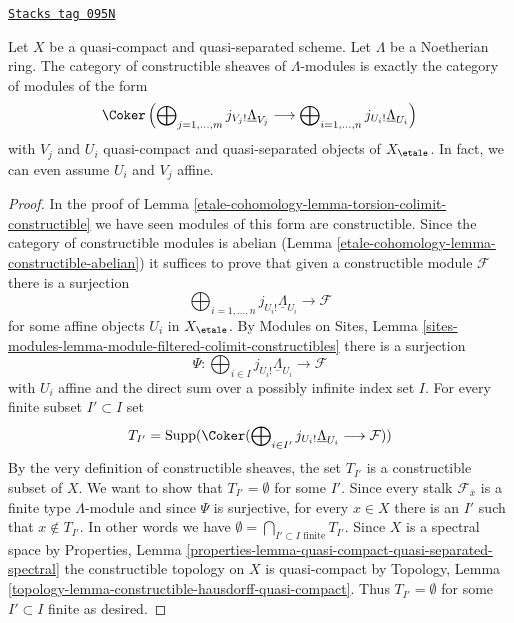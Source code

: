 \begin{lemma}
\label{etale-cohomology-lemma-category-constructible-modules}
\href{https://stacks.math.columbia.edu/tag/095N}{\texttt{Stacks tag 095N}}

Let $X$ be a quasi-compact and quasi-separated scheme. Let $\Lambda$
be a Noetherian ring. The category of constructible sheaves of
$\Lambda$-modules is exactly the category of modules of the form
$$
\Coker\left(
\bigoplus\nolimits_{j = 1, \ldots, m} j_{V_j!}\underline{\Lambda}_{V_j}
\longrightarrow
\bigoplus\nolimits_{i = 1, \ldots, n} j_{U_i!}\underline{\Lambda}_{U_i}
\right)
$$
with $V_j$ and $U_i$ quasi-compact and quasi-separated objects of
$X_\etale$. In fact, we can even assume $U_i$ and $V_j$ affine.
\end{lemma}

\begin{proof}
In the proof of Lemma \ref{etale-cohomology-lemma-torsion-colimit-constructible}
we have seen modules of this form are constructible. Since the
category of constructible modules is abelian
(Lemma \ref{etale-cohomology-lemma-constructible-abelian})
it suffices to prove that given a constructible module $\mathcal{F}$
there is a surjection
$$
\bigoplus\nolimits_{i = 1, \ldots, n} j_{U_i!}\underline{\Lambda}_{U_i}
\longrightarrow \mathcal{F}
$$
for some affine objects $U_i$ in $X_\etale$. By
Modules on Sites, Lemma
\ref{sites-modules-lemma-module-filtered-colimit-constructibles}
there is a surjection
$$
\Psi :
\bigoplus\nolimits_{i \in I} j_{U_i!}\underline{\Lambda}_{U_i}
\longrightarrow
\mathcal{F}
$$
with $U_i$ affine and the direct sum over a possibly infinite
index set $I$. For every finite subset $I' \subset I$ set
$$
T_{I'} = \text{Supp}(\Coker(
\bigoplus\nolimits_{i \in I'} j_{U_i!}\underline{\Lambda}_{U_i}
\longrightarrow \mathcal{F}))
$$
By the very definition of constructible sheaves, the set $T_{I'}$
is a constructible subset of $X$. We want to show that $T_{I'} = \emptyset$
for some $I'$. Since every stalk $\mathcal{F}_{\overline{x}}$ is
a finite type $\Lambda$-module and since $\Psi$ is surjective, for
every $x \in X$ there is an $I'$ such that $x \not \in T_{I'}$.
In other words we have
$\emptyset = \bigcap_{I' \subset I\text{ finite}} T_{I'}$. Since
$X$ is a spectral space by Properties, Lemma
\ref{properties-lemma-quasi-compact-quasi-separated-spectral}
the constructible topology on $X$ is quasi-compact by
Topology, Lemma \ref{topology-lemma-constructible-hausdorff-quasi-compact}.
Thus $T_{I'} = \emptyset$ for some $I' \subset I$ finite
as desired.
\end{proof}

